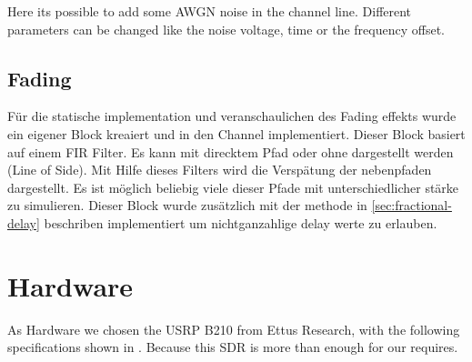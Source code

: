 Here its possible to add some AWGN noise in the channel line. Different parameters can be changed like the noise voltage, time or the frequency offset.


%
%

\subsection{Fading}
Für die statische implementation und veranschaulichen des Fading effekts wurde ein eigener Block kreaiert und in den Channel implementiert. Dieser Block basiert auf einem FIR Filter. Es kann mit direcktem Pfad oder ohne dargestellt werden (Line of Side). Mit Hilfe dieses Filters wird die Verspätung der nebenpfaden dargestellt. Es ist möglich beliebig viele dieser Pfade mit unterschiedlicher stärke zu simulieren. Dieser Block wurde zusätzlich mit der methode in \ref{sec:fractional-delay} beschriben implementiert um nichtganzahlige delay werte zu erlauben.






\section{Hardware}

As Hardware we chosen the USRP B210 from Ettus Research, with the following specifications shown in . Because this SDR is more than enough for our requires.


